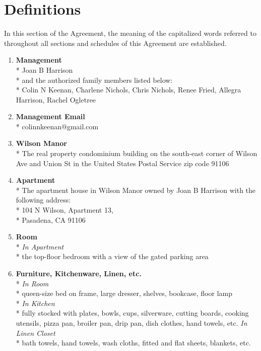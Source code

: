 \documentclass[12pt,letterpaper]{article}
\newcommand{\mom}{Joan B Harrison}
\newcommand{\management}{Management}
\newcommand{\myemail}{Management Email}
\newcommand{\condo}{Wilson Manor}
\newcommand{\apt}{Apartment}
\newcommand{\room}{Room}
\newcommand{\furniture}{Furniture, Kitchenware, Linen, etc.}
\begin{document}
\section{Definitions} \label{definitions}
	In this section of the Agreement, the meaning of the capitalized words referred to throughout all sections and schedules of this Agreement are established.
	\begin{multicols}{2}
		\begin{enumerate} 
			\item \textbf{\management{}}\\* \label{management}
				\noindent \mom{}\\*
				and the authorized family members listed below:\\*
				Colin N Keenan,
				Charlene Nichols,
				Chris Nichols,
				Renee Fried,
				Allegra Harrison,
				Rachel Ogletree
					
			\item \textbf{\myemail{}}\\* \label{myemail}
				colinnkeenan@gmail.com

			\item \textbf{\condo{}}\\* \label{condo}
				The real property condominium building on the south-east corner of Wilson Ave and Union St in the United States Postal Service zip code 91106

			\item \textbf{\apt{}}\\* \label{apt}
				The apartment house in \condo{} owned by \mom{} with the following address:\\*
				104 N Wilson, \apt{} 13,\\* 
				Pasadena, CA  91106

			\item \textbf{\room{}}\\* \label{room}
				\textit{In \apt{}}\\*
				the top-floor bedroom with a view of the gated parking area

			\item \textbf{\furniture{}}\\* \label{furniture}
				\textit{In \room{}}\\*
				queen-size bed on frame, large dresser, shelves, bookcase, floor lamp\\*
				\textit{In Kitchen}\\*
				fully stocked with plates, bowls, cups, silverware, cutting boards, cooking utensils, pizza pan, broiler pan, drip pan, dish clothes, hand towels, etc.
				\textit{In Linen Closet}\\*
				bath towels, hand towels, wash cloths, fitted and flat sheets, blankets, etc.


\end{enumerate}
\end{multicols}
\end{document}
